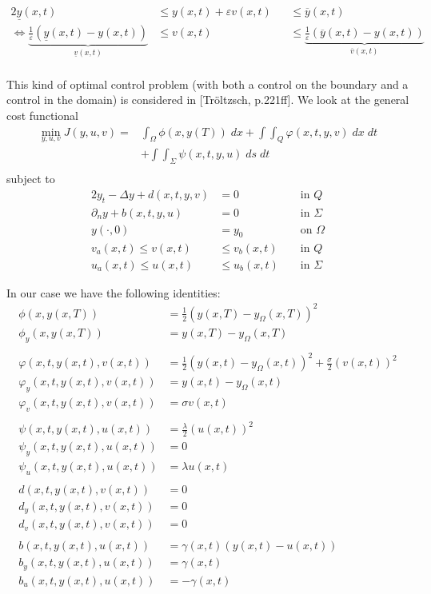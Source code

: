 \documentclass[
12pt, %
a4paper, %
onecolumn, %
portrait %
]{article}
\begin{document}
\begin{alignat*}{2}
\underline{y}(x,t) &\leq y(x,t) + \varepsilon v(x,t) &&\leq \overline{y}(x,t) \\
\Leftrightarrow \underbrace{\frac{1}{\varepsilon}(\underline{y}(x,t) - y(x,t))}_{\underline{v}(x,t)} &\leq v(x,t) &&\leq \underbrace{\frac{1}{\varepsilon}(\overline{y}(x,t) - y(x,t))}_{\overline{v}(x,t)} \\
\end{alignat*}

This kind of optimal control problem (with both a control on the boundary and a control in the domain) is considered in [Tr\"oltzsch, p.221ff]. We look at the general cost functional
\begin{align*}
\min_{y,u,v} J(y, u, v) = & \int_{\Omega} \phi(x, y(T)) \; dx + \int \int_{Q} \varphi(x, t, y, v) \; dx \; dt \\
& + \int \int_{\Sigma} \psi(x,t,y, u) \; ds \; dt \\
\end{align*}
subject to
\begin{alignat*}{2}
y_t - \Delta y + d(x,t,y,v) &= 0 && \text{ in } Q \\
\partial_n y + b(x,t,y,u) &= 0 && \text{ in } \Sigma \\
y(\cdot,0) &= y_0 && \text{ on } \Omega \\
v_a(x,t) \leq v(x,t) &\leq v_b(x,t) &&\text{ in } Q \\
u_a(x,t) \leq u(x,t) &\leq u_b(x,t) &&\text{ in } \Sigma
\end{alignat*}

In our case we have the following identities:
\begin{align*}
\phi(x,y(x,T)) & = \frac{1}{2} (y(x,T) - y_{\Omega}(x,T))^2 \\
\phi_y(x,y(x,T)) & = y(x,T) - y_{\Omega}(x,T) \\
\\
\varphi(x,t, y(x,t), v(x,t)) & = \frac{1}{2} (y(x,t) - y_{\Omega}(x,t))^2 + \frac{\sigma}{2} (v(x,t))^2 \\
\varphi_y(x,t,y(x,t), v(x,t)) &= y(x,t) - y_{\Omega}(x,t) \\
\varphi_v(x,t,y(x,t), v(x,t)) &= \sigma v(x,t) \\
\\
\psi(x,t,y(x,t), u(x,t)) &= \frac{\lambda}{2} (u(x,t))^2 \\
\psi_y(x,t,y(x,t), u(x,t)) &= 0 \\
\psi_u(x,t,y(x,t), u(x,t)) &= \lambda u(x,t) \\
\\
d(x,t, y(x,t), v(x,t)) &= 0 \\
d_y(x,t, y(x,t), v(x,t)) &= 0 \\
d_v(x,t, y(x,t), v(x,t)) &= 0 \\
\\
b(x,t, y(x,t), u(x,t)) &= \gamma(x,t) (y(x,t) - u(x,t)) \\
b_y(x,t, y(x,t), u(x,t)) &= \gamma(x,t) \\
b_u(x,t, y(x,t), u(x,t)) &= -\gamma(x,t)
\end{align*}
\end{document}
